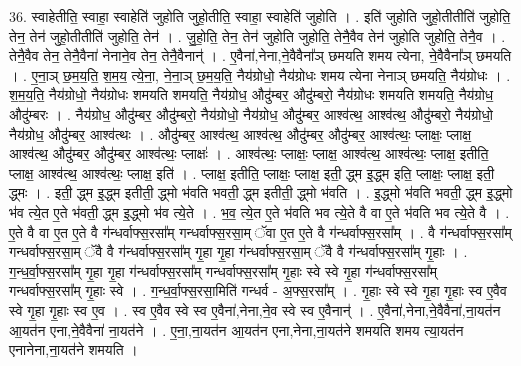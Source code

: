 \documentclass[17pt]{extarticle}
\begin{document}
36. स्वाहेतीति॒ स्वाहा॒ स्वाहेति॑ जुहोति जुहो॒तीति॒ स्वाहा॒ स्वाहेति॑ जुहोति । . इति॑ जुहोति जुहो॒तीतीति॑ जुहोति॒ तेन॒ तेन॑ जुहो॒तीतीति॑ जुहोति॒ तेन॑ । . जु॒हो॒ति॒ तेन॒ तेन॑ जुहोति जुहोति॒ तेनै॒वैव तेन॑ जुहोति जुहोति॒ तेनै॒व । . तेनै॒वैव तेन॒ तेनै॒वैना॑ नेनाने॒व तेन॒ तेनै॒वैनान्॑ । . ए॒वैना॑,नेना,ने॒वैवैना᳚ञ् छमयति शमय त्येना, ने॒वैवैना᳚ञ् छमयति । . ए॒ना॒ञ् छ॒म॒य॒ति॒ श॒म॒य॒ त्ये॒ना॒, ने॒ना॒ञ् छ॒म॒य॒ति॒ नैय॑ग्रोधो॒ नैय॑ग्रोधः शमय त्येना नेनाञ् छमयति॒ नैय॑ग्रोधः । . श॒म॒य॒ति॒ नैय॑ग्रोधो॒ नैय॑ग्रोधः शमयति शमयति॒ नैय॑ग्रोध॒ औदु॑म्बर॒ औदु॑म्बरो॒ नैय॑ग्रोधः शमयति शमयति॒ नैय॑ग्रोध॒ औदु॑म्बरः । . नैय॑ग्रोध॒ औदु॑म्बर॒ औदु॑म्बरो॒ नैय॑ग्रोधो॒ नैय॑ग्रोध॒ औदु॑म्बर॒ आश्व॑त्थ॒ आश्व॑त्थ॒ औदु॑म्बरो॒ नैय॑ग्रोधो॒ नैय॑ग्रोध॒ औदु॑म्बर॒ आश्व॑त्थः । . औदु॑म्बर॒ आश्व॑त्थ॒ आश्व॑त्थ॒ औदु॑म्बर॒ औदु॑म्बर॒ आश्व॑त्थः॒ प्लाक्षः॒ प्लाक्ष॒ आश्व॑त्थ॒ औदु॑म्बर॒ औदु॑म्बर॒ आश्व॑त्थः॒ प्लाक्षः॑ । . आश्व॑त्थः॒ प्लाक्षः॒ प्लाक्ष॒ आश्व॑त्थ॒ आश्व॑त्थः॒ प्लाक्ष॒ इतीति॒ प्लाक्ष॒ आश्व॑त्थ॒ आश्व॑त्थः॒ प्लाक्ष॒ इति॑ । . प्लाक्ष॒ इतीति॒ प्लाक्षः॒ प्लाक्ष॒ इती॒ द्ध्म इ॒द्ध्म इति॒ प्लाक्षः॒ प्लाक्ष॒ इती॒ द्ध्मः । . इती॒ द्ध्म इ॒द्ध्म इतीती॒ द्ध्मो भ॑वति भवती॒ द्ध्म इतीती॒ द्ध्मो भ॑वति । . इ॒द्ध्मो भ॑वति भवती॒ द्ध्म इ॒द्ध्मो भ॑व त्ये॒त ए॒ते भ॑वती॒ द्ध्म इ॒द्ध्मो भ॑व त्ये॒ते । . भ॒व॒ त्ये॒त ए॒ते भ॑वति भव त्ये॒ते वै वा ए॒ते भ॑वति भव त्ये॒ते वै । . ए॒ते वै वा ए॒त ए॒ते वै ग॑न्धर्वाफ्स॒रसा᳚म् गन्धर्वाफ्स॒रसा॒म् ॅवा ए॒त ए॒ते वै ग॑न्धर्वाफ्स॒रसा᳚म् । . वै ग॑न्धर्वाफ्स॒रसा᳚म् गन्धर्वाफ्स॒रसा॒म् ॅवै वै ग॑न्धर्वाफ्स॒रसा᳚म् गृ॒हा गृ॒हा ग॑न्धर्वाफ्स॒रसा॒म् ॅवै वै ग॑न्धर्वाफ्स॒रसा᳚म् गृ॒हाः । . ग॒न्ध॒र्वा॒फ्स॒रसा᳚म् गृ॒हा गृ॒हा ग॑न्धर्वाफ्स॒रसा᳚म् गन्धर्वाफ्स॒रसा᳚म् गृ॒हाः स्वे स्वे गृ॒हा ग॑न्धर्वाफ्स॒रसा᳚म् गन्धर्वाफ्स॒रसा᳚म् गृ॒हाः स्वे । . ग॒न्ध॒र्वा॒फ्स॒रसा॒मिति॑ गन्धर्व - अ॒फ्स॒रसा᳚म् । . गृ॒हाः स्वे स्वे गृ॒हा गृ॒हाः स्व ए॒वैव स्वे गृ॒हा गृ॒हाः स्व ए॒व । . स्व ए॒वैव स्वे स्व ए॒वैना॑,नेना,ने॒व स्वे स्व ए॒वैनान्॑ । . ए॒वैना॑,नेना,ने॒वैवैना॑,ना॒यत॑न आ॒यत॑न एना,ने॒वैवैना॑ ना॒यत॑ने । . ए॒ना॒,ना॒यत॑न आ॒यत॑न एना,नेना,ना॒यत॑ने शमयति शमय त्या॒यत॑न एनानेना,ना॒यत॑ने शमयति । \newline
\pagebreak
{}
\end{document}
